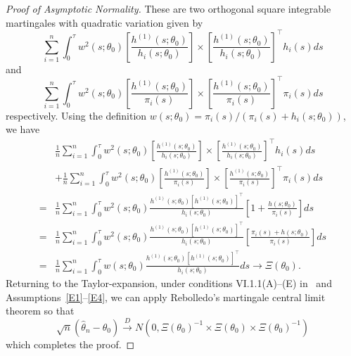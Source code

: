 \documentclass[12pt]{amsart}
\begin{document}
\begin{proof}[Proof of Asymptotic Normality]
These are two orthogonal square integrable martingales with quadratic variation given by
\[
\sum_{i=1}^n \int_0^\tau w^2(s;\theta_0) \left[ \frac{h^{(1)}(s; \theta_0)}{h_i (s;\theta_0)} \right] \times \left[ \frac{h^{(1)} (s;\theta_0)}{h_i (s;\theta_0)} \right]^\top h_i (s) ds
\]
and
\[
\sum_{i=1}^n \int_0^\tau w^2(s;\theta_0) \left[ \frac{h^{(1)}(s; \theta_0)}{\pi_i (s)} \right] \times \left[ \frac{h^{(1)} (s;\theta_0)}{\pi_i (s)} \right]^\top \pi_i (s) ds
\]
respectively.  Using the definition $w(s;\theta_0) = \pi_i(s) / (\pi_i(s)+h_i(s;\theta_0))$, we have
\begin{align*}
&\frac{1}{n} \sum_{i=1}^n \int_0^\tau w^2(s;\theta_0) \left[ \frac{h^{(1)}(s; \theta_0)}{h_i (s;\theta_0)} \right] \times \left[ \frac{h^{(1)} (s;\theta_0)}{h_i (s;\theta_0)} \right]^\top h_i (s) ds \\
&+
\frac{1}{n} \sum_{i=1}^n \int_0^\tau w^2(s;\theta_0) \left[ \frac{h^{(1)}(s; \theta_0)}{\pi_i (s)} \right] \times \left[ \frac{h^{(1)} (s;\theta_0)}{\pi_i (s)} \right]^\top \pi_i (s) ds \\
=& \frac{1}{n} \sum_{i=1}^n \int_0^\tau w^2(s;\theta_0) \frac{h^{(1)}(s; \theta_0) [h^{(1)} (s;\theta_0)]^\top}{h_i (s;\theta_0)} \left[ 1 + \frac{h(s;\theta_0)}{\pi_i (s)} \right] ds \\
=& \frac{1}{n} \sum_{i=1}^n \int_0^\tau w^2(s;\theta_0) \frac{h^{(1)}(s; \theta_0) [h^{(1)} (s;\theta_0)]^\top}{h_i (s;\theta_0)} \left[ \frac{\pi_i (s) + h(s;\theta_0)}{\pi_i (s)} \right] ds \\
=& \frac{1}{n} \sum_{i=1}^n \int_0^\tau w(s;\theta_0) \frac{h^{(1)}(s; \theta_0) [h^{(1)} (s;\theta_0)]^\top}{h_i (s;\theta_0)} ds
\to \Xi (\theta_0).
\end{align*}
Returning to the Taylor-expansion, under conditions VI.1.1(A)--(E) in~\cite{Andersen1993} and Assumptions~\ref{E1}--\ref{E4}, we can apply Rebolledo's martingale central limit theorem so that
$$
\sqrt{n} (\hat \theta_n - \theta_0) \overset{D}{\to} N(0, \Xi(\theta_0) ^{-1} \times \Xi(\theta_0) \times \Xi(\theta_0) ^{-1} )
$$
which completes the proof.
\end{proof}

\end{document}

